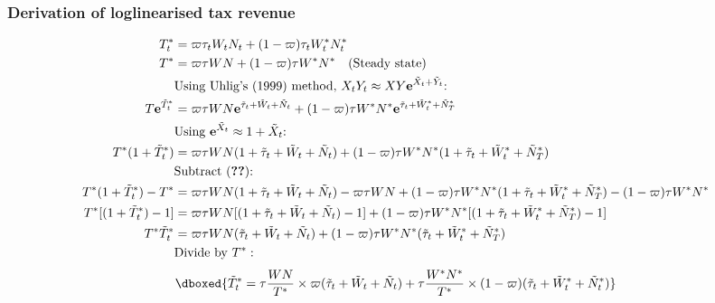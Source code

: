 \subsubsection{Derivation of loglinearised tax revenue}
\begin{align*}
    T^*_t &= \varpi\tau_t W_t N_t + (1-\varpi)\tau_t W^*_t N^*_t \\
    T^* &= \varpi\tau W N + (1-\varpi)\tau W^* N^* \quad \text{(Steady state)}\\
    &\text{Using Uhlig's (1999) method, $X_tY_t \approx XY\mathbf{e}^{\tilde{X}_t + \tilde{Y}_t}$: }\nonumber\\
    T\mathbf{e}^{\tilde{T}^*_t} &= \varpi \tau W N \mathbf{e}^{\tilde{\tau}_t+\tilde{W}_t+\tilde{N}_t} + (1-\varpi) \tau W^* N^* \mathbf{e}^{\tilde{\tau}_t+\tilde{W}^*_t+\tilde{N}^*_T} \\
    &\text{Using $\mathbf{e}^{\tilde{X}_t} \approx 1 + {\tilde{X}_t}$: }\nonumber\\
    T^* (1 + {\tilde{T}^*_t}) &= \varpi \tau W N (1 + {\tilde{\tau}_t+\tilde{W}_t+\tilde{N}_t}) + (1-\varpi) \tau W^* N^* (1 + {\tilde{\tau}_t+\tilde{W}^*_t+\tilde{N}^*_T}) \\
    &\text{Subtract (\textbf{??}): } \nonumber\\
    T^* (1 + {\tilde{T}^*_t}) - T^* &= \varpi \tau W N (1 + {\tilde{\tau}_t+\tilde{W}_t+\tilde{N}_t}) - \varpi\tau W N + (1-\varpi) \tau W^* N^* (1 + {\tilde{\tau}_t+\tilde{W}^*_t+\tilde{N}^*_T}) - (1-\varpi)\tau W^* N^* \\
    T^*[(1 + {\tilde{T}^*_t}) - 1] &= \varpi \tau W N [(1 + {\tilde{\tau}_t+\tilde{W}_t+\tilde{N}_t}) - 1] + (1-\varpi) \tau W^* N^* [(1 + {\tilde{\tau}_t+\tilde{W}^*_t+\tilde{N}^*_T}) - 1] \\
    T^*\tilde{T}^*_t &= \varpi \tau W N (\tilde{\tau}_t + \tilde{W}_t + \tilde{N}_t) + (1-\varpi) \tau W^* N^* (\tilde{\tau}_t+\tilde{W}^*_t+\tilde{N}^*_T) \\
    &\text{Divide by $T^*$}:\nonumber
\end{align*}
\begin{equation}
    \dboxed{\tilde{T}^*_t = \tau\frac{ W N}{T^*}\times \varpi (\tilde{\tau}_t + \tilde{W}_t + \tilde{N}_t) + \tau \frac{ W^* N^*}{T^*} \times (1-\varpi) (\tilde{\tau}_t+\tilde{W}^*_t+\tilde{N}^*_t)}
\end{equation}
\newpage